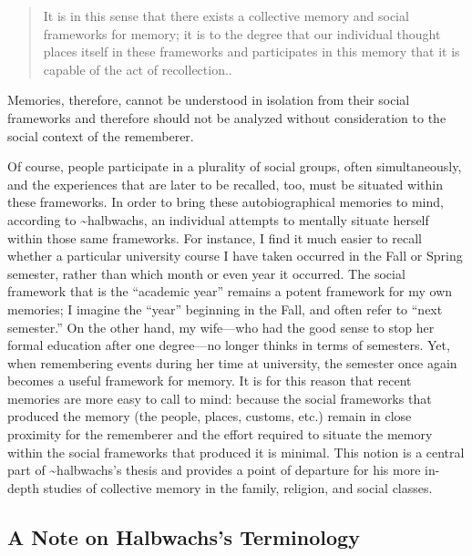 \begin{quote}
It is in this sense that there exists a collective memory and social
frameworks for memory; it is to the degree that our individual thought
places itself in these frameworks and participates in this memory that
it is capable of the act of recollection.\autocite[38]{halbwachs1992}.
\end{quote}

Memories, therefore, cannot be understood in isolation from their social
frameworks and therefore should not be analyzed without consideration to
the social context of the rememberer.

Of course, people participate in a plurality of social groups, often
simultaneously, and the experiences that are later to be recalled, too,
must be situated within these frameworks. In order to bring these
autobiographical memories to mind, according to
\textasciitilde{}halbwachs, an individual attempts to mentally situate
herself within those same frameworks. For instance, I find it much
easier to recall whether a particular university course I have taken
occurred in the Fall or Spring semester, rather than which month or even
year it occurred. The social framework that is the ``academic year''
remains a potent framework for my own memories; I imagine the ``year''
beginning in the Fall, and often refer to ``next semester.'' On the
other hand, my wife---who had the good sense to stop her formal
education after one degree---no longer thinks in terms of semesters.
Yet, when remembering events during her time at university, the semester
once again becomes a useful framework for memory. It is for this reason
that recent memories are more easy to call to mind: because the social
frameworks that produced the memory (the people, places, customs, etc.)
remain in close proximity for the rememberer and the effort required to
situate the memory within the social frameworks that produced it is
minimal.\autocite[52]{halbwachs1992} This notion is a central part of
\textasciitilde{}halbwachs's thesis and provides a point of departure
for his more in-depth studies of collective memory in the family,
religion, and social classes.

\hypertarget{a-note-on-halbwachss-terminology}{%
\subsection{A Note on Halbwachs's
Terminology}\label{a-note-on-halbwachss-terminology}}

